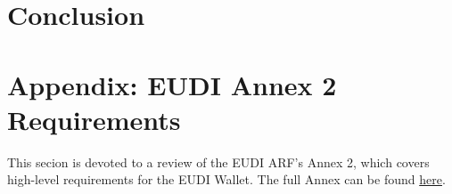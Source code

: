 \documentclass{iacrtrans}
\newcommand{\jbel}[1]{{\color{blue}{}jbel: #1}}
\begin{document}


\section{Conclusion}
\label{sec:conclusion}




\section{Appendix: EUDI Annex 2 Requirements}

This secion is devoted to a review of the EUDI ARF's Annex 2, which covers high-level requirements for the EUDI Wallet. 
The full Annex can be found \href{https://eu-digital-identity-wallet.github.io/eudi-doc-architecture-and-reference-framework/1.4.0/annexes/annex-2/annex-2-high-level-requirements/#a231-topic-1-accessing-public-and-private-online-services-with-eudi-wallet}{here}.
\end{document}
